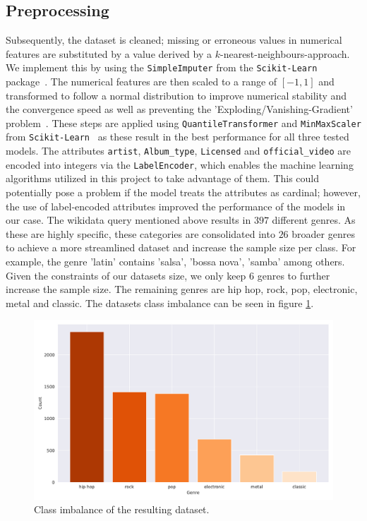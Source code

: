 \documentclass[
  12pt,
  bibliography=totoc,     %
  captions=tableheading,  %
  titlepage=firstiscover, %
]{scrartcl}
\begin{document}
\subsection{Preprocessing}
Subsequently, the dataset is cleaned; missing or erroneous values
in numerical features are substituted by a value derived by a $k$-nearest-neighbours-approach. We implement this
by using the \texttt{SimpleImputer} from the \texttt{Scikit-Learn} package~\cite{scikit-learn}.
The numerical features are then scaled to a range of $[-1,1]$ and transformed to follow a normal distribution to improve numerical stability
and the convergence speed as well as preventing the 'Exploding/Vanishing-Gradient' problem~\cite{geron}. These steps are applied using \texttt{QuantileTransformer} and
\texttt{MinMaxScaler} from \texttt{Scikit-Learn}~\cite{scikit-learn} as these result in the best performance for all three tested models.
The attributes \texttt{artist}, \texttt{Album\_type}, \texttt{Licensed} and \texttt{official\_video} are encoded into integers via the \texttt{LabelEncoder},
which enables the machine learning algorithms utilized in this project to take advantage of them. This could potentially pose a problem if the model treats the attributes as
cardinal; however, the use of label-encoded attributes improved the performance of the models in our case.
The wikidata query mentioned above results in $397$ different genres. As these are highly specific, these categories are consolidated into $26$ broader genres to
achieve a more streamlined dataset and increase the sample size per class. For example, the genre 'latin' contains 'salsa', 'bossa nova', 'samba' among others.
Given the constraints of our datasets size, we only keep $6$ genres to further increase the sample
size. The remaining genres are hip hop, rock, pop, electronic, metal and classic. The datasets class imbalance can be seen in figure \ref{fig:class-imbalance}.
\FloatBarrier
\begin{figure}[h]
  \centering
  \includegraphics[scale=0.6]{figures/genre_hist_oranges.pdf}
  \caption{Class imbalance of the resulting dataset.}
  \label{fig:class-imbalance}
\end{figure}
\end{document}
